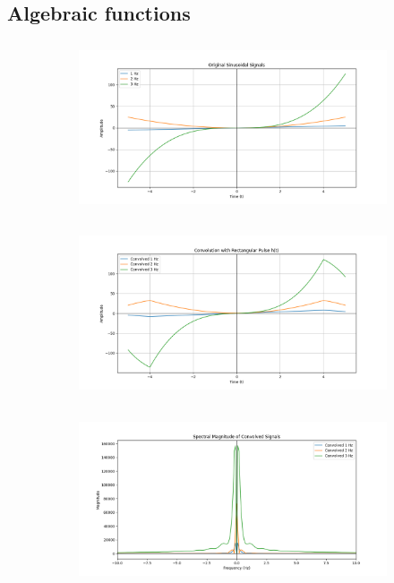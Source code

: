 \documentclass[a4paper,12pt]{article}
\begin{document}
\subsection * {Algebraic functions}
\begin{figure}[H]
    \centering
    \begin{subfigure}{0.5\textwidth}
        \centering
        \includegraphics[height=5cm]{figs/alg1.png}
    \end{subfigure}%
    \begin{subfigure}{0.5\textwidth}
        \centering
        \includegraphics[height=5cm]{figs/alg2.png}
    \end{subfigure}
    \begin{subfigure}{0.5\textwidth}
        \centering
        \includegraphics[height=5cm]{figs/alg3.png}
    \end{subfigure}%
\end{figure}
\end{document}

